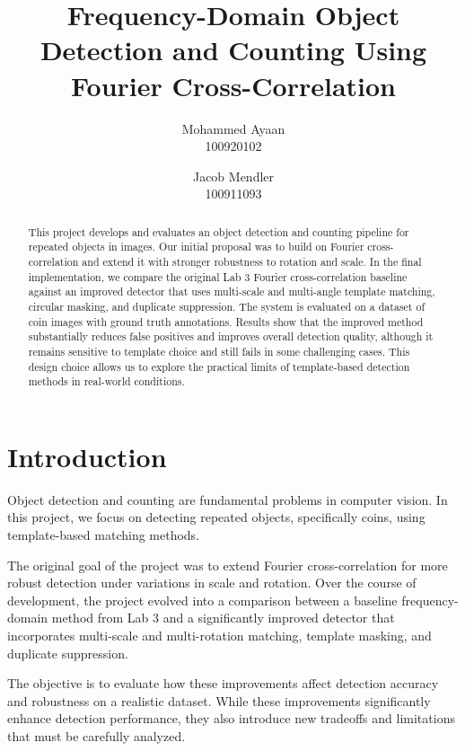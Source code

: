 \documentclass[11pt, letterpaper, twoside]{article}
\title{\textbf{Frequency-Domain Object Detection and Counting Using Fourier Cross-Correlation}}
\author{Mohammed Ayaan \\ 100920102 \and Jacob Mendler \\ 100911093}
\affiliation{Ontario Tech University}
\begin{document}
\maketitle

\begin{abstract}
\noindent
This project develops and evaluates an object detection and counting pipeline for repeated objects in images. Our initial proposal was to build on Fourier cross-correlation and extend it with stronger robustness to rotation and scale. In the final implementation, we compare the original Lab 3 Fourier cross-correlation baseline against an improved detector that uses multi-scale and multi-angle template matching, circular masking, and duplicate suppression. The system is evaluated on a dataset of coin images with ground truth annotations. Results show that the improved method substantially reduces false positives and improves overall detection quality, although it remains sensitive to template choice and still fails in some challenging cases. This design choice allows us to explore the practical limits of template-based detection methods in real-world conditions.
\end{abstract}

\vspace{2.5cm}

\thispagestyle{firstpage}

\pagebreak

\newgeometry{}

\section{Introduction}

Object detection and counting are fundamental problems in computer vision. In this project, we focus on detecting repeated objects, specifically coins, using template-based matching methods.

The original goal of the project was to extend Fourier cross-correlation for more robust detection under variations in scale and rotation. Over the course of development, the project evolved into a comparison between a baseline frequency-domain method from Lab 3 and a significantly improved detector that incorporates multi-scale and multi-rotation matching, template masking, and duplicate suppression.

The objective is to evaluate how these improvements affect detection accuracy and robustness on a realistic dataset. While these improvements significantly enhance detection performance, they also introduce new tradeoffs and limitations that must be carefully analyzed.
\end{document}
